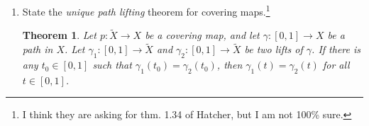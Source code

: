\documentclass{article}
\newtheorem*{theorem}{Theorem}
\begin{document}
\begin{enumerate}
\begin{proof}
Strictly speaking, we have computed $\pi_1(C,(p,1))$. However, since everything we have dealt with is path connected,
we obtain the isomorphism $\pi_1(C, (p,1)) \cong \pi_1(C, (p, 1/2))$. 

\end{proof}
	
\setcounter{enumi}{9}
\item State the \emph{unique path lifting} theorem for covering maps.\footnote{I think they are asking for thm. 1.34 of Hatcher, but I am not 100\% sure.}

\begin{theorem}
Let $p: \tilde{X} \rightarrow X$ be a covering map, and let $\gamma: [0,1] \rightarrow X$ be a
path in $X$. Let $\gamma_1: [0,1] \rightarrow \tilde{X}$ and $\gamma_2: [0,1]\rightarrow \tilde{X}$
be two lifts of $\gamma$. If there is any $t_0 \in [0,1]$ such that $\gamma_1(t_0) = \gamma_2(t_0)$, then
$\gamma_1(t) = \gamma_2(t)$ for all $t \in [0,1]$.
\end{theorem}

\end{enumerate}
\end{document}
